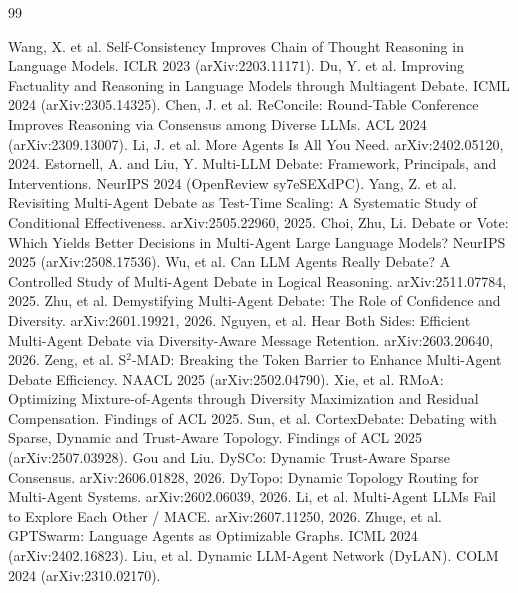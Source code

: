 \documentclass[11pt]{article}
\begin{document}
\begin{thebibliography}{99}

 Wang, X. et al. Self-Consistency Improves Chain of Thought Reasoning in Language Models. ICLR 2023 (arXiv:2203.11171).
 Du, Y. et al. Improving Factuality and Reasoning in Language Models through Multiagent Debate. ICML 2024 (arXiv:2305.14325).
 Chen, J. et al. ReConcile: Round-Table Conference Improves Reasoning via Consensus among Diverse LLMs. ACL 2024 (arXiv:2309.13007).
 Li, J. et al. More Agents Is All You Need. arXiv:2402.05120, 2024.
 Estornell, A. and Liu, Y. Multi-LLM Debate: Framework, Principals, and Interventions. NeurIPS 2024 (OpenReview sy7eSEXdPC).
 Yang, Z. et al. Revisiting Multi-Agent Debate as Test-Time Scaling: A Systematic Study of Conditional Effectiveness. arXiv:2505.22960, 2025.
 Choi, Zhu, Li. Debate or Vote: Which Yields Better Decisions in Multi-Agent Large Language Models? NeurIPS 2025 (arXiv:2508.17536).
 Wu, et al. Can LLM Agents Really Debate? A Controlled Study of Multi-Agent Debate in Logical Reasoning. arXiv:2511.07784, 2025.
 Zhu, et al. Demystifying Multi-Agent Debate: The Role of Confidence and Diversity. arXiv:2601.19921, 2026.
 Nguyen, et al. Hear Both Sides: Efficient Multi-Agent Debate via Diversity-Aware Message Retention. arXiv:2603.20640, 2026.
 Zeng, et al. S$^2$-MAD: Breaking the Token Barrier to Enhance Multi-Agent Debate Efficiency. NAACL 2025 (arXiv:2502.04790).
 Xie, et al. RMoA: Optimizing Mixture-of-Agents through Diversity Maximization and Residual Compensation. Findings of ACL 2025.
 Sun, et al. CortexDebate: Debating with Sparse, Dynamic and Trust-Aware Topology. Findings of ACL 2025 (arXiv:2507.03928).
 Gou and Liu. DySCo: Dynamic Trust-Aware Sparse Consensus. arXiv:2606.01828, 2026.
 DyTopo: Dynamic Topology Routing for Multi-Agent Systems. arXiv:2602.06039, 2026.
 Li, et al. Multi-Agent LLMs Fail to Explore Each Other / MACE. arXiv:2607.11250, 2026.
 Zhuge, et al. GPTSwarm: Language Agents as Optimizable Graphs. ICML 2024 (arXiv:2402.16823).
 Liu, et al. Dynamic LLM-Agent Network (DyLAN). COLM 2024 (arXiv:2310.02170).

\end{thebibliography}
\end{document}
